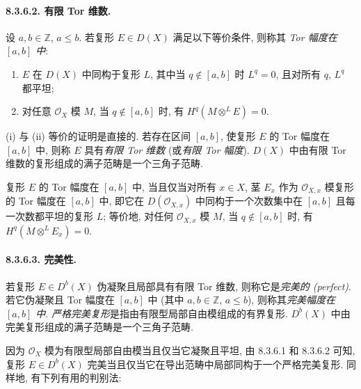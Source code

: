 \paragraph{8.3.6.2. 有限 Tor 维数.}
设 $a,b\in\mathbb Z$, $a\leq b$. 若复形 $E\in D(X)$ 满足以下等价条件, 则称其 \emph{Tor 幅度在 $[a,b]$ 中}:
\begin{enumerate}
\item[(i)] $E$ 在 $D(X)$ 中同构于复形 $L$, 其中当 $q\notin[a,b]$ 时 $L^q=0$, 且对所有 $q$, $L^q$ 都平坦;
\item[(ii)] 对任意 $\mathcal O_X$ 模 $M$, 当 $q\notin[a,b]$ 时, 有 $H^q(M\otimes^LE)=0$.
\end{enumerate}
(i) 与 (ii) 等价的证明是直接的. 若存在区间 $[a,b]$, 使复形 $E$ 的 Tor 幅度在 $[a,b]$ 中, 则称 $E$ 具有\emph{有限 Tor 维数} (或\emph{有限 Tor 幅度}). $D(X)$ 中由有限 Tor 维数的复形组成的满子范畴是一个三角子范畴.

复形 $E$ 的 Tor 幅度在 $[a,b]$ 中, 当且仅当对所有 $x\in X$, 茎 $E_x$ 作为 $\mathcal O_{X,x}$ 模复形的 Tor 幅度在 $[a,b]$ 中, 即它在 $D(\mathcal O_{X,x})$ 中同构于一个次数集中在 $[a,b]$ 且每一次数都平坦的复形 $L$; 等价地, 对任何 $\mathcal O_{X,x}$ 模 $M$, 当 $q\notin[a,b]$ 时, 有 $H^q(M\otimes^LE_x)=0$.

\paragraph{8.3.6.3. 完美性.}
若复形 $E\in D^b(X)$ 伪凝聚且局部具有有限 Tor 维数, 则称它是\emph{完美的 (perfect)}. 若它伪凝聚且 Tor 幅度在 $[a,b]$ 中 (其中 $a,b\in\mathbb Z$, $a\leq b$), 则称其\emph{完美幅度在 $[a,b]$ 中}. \emph{严格完美复形}是指由有限型局部自由模组成的有界复形. $D^b(X)$ 中由完美复形组成的满子范畴是一个三角子范畴.

因为 $\mathcal O_X$ 模为有限型局部自由模当且仅当它凝聚且平坦, 由 8.3.6.1 和 8.3.6.2 可知, 复形 $E\in D^b(X)$ 完美当且仅当它在导出范畴中局部同构于一个严格完美复形. 同样地, 有下列有用的判别法:

